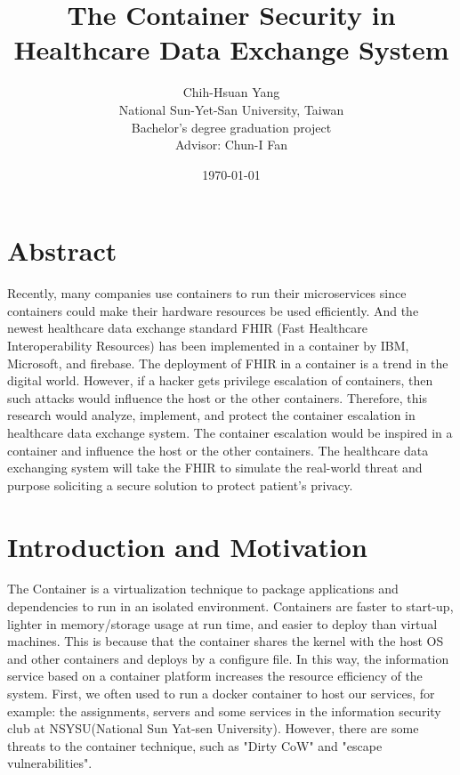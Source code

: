 \documentclass[12pt,a4paper]{article}
\title{{The Container Security in Healthcare Data Exchange System}}
\author{Chih-Hsuan Yang\\
National Sun-Yet-San University, Taiwan \\
Bachelor's degree graduation project \\
Advisor: Chun-I Fan
}
\date{\today}
\begin{document}
\section{Abstract}
Recently, many companies use containers to run their microservices since containers could
make their hardware resources be used efficiently. And the newest healthcare data exchange
standard FHIR (Fast Healthcare Interoperability Resources) \cite{FHIR_home} has been implemented
in a container by IBM, Microsoft, and firebase. The deployment of FHIR in a container is a
trend in the digital world.\cite{Infrastructures} However, if a hacker gets privilege
escalation of containers, then such attacks would influence the host or the other containers.
Therefore, this research would analyze, implement, and protect the container escalation
in healthcare data exchange system. The container escalation would be inspired in a container
and influence the host or the other containers. The healthcare data exchanging system will
take the FHIR to simulate the real-world threat and purpose soliciting a secure solution to
protect patient's privacy.


\section{Introduction and Motivation}
The Container is a virtualization technique to package applications and dependencies to run in
an isolated environment. Containers are faster to start-up, lighter in memory/storage usage
at run time, and easier to deploy than virtual machines. This is because that the container
shares the kernel with the host OS and other containers and deploys by a configure file.
\cite{Offloading} In this way, the information service based on a container platform increases
the resource efficiency of the system. \cite{Comparison}
First, we often used to run a docker container to host our services, for example: the assignments,
servers and some services in the information security club at NSYSU(National Sun Yat-sen University).
However, there are some threats to the container technique, such as "Dirty CoW" \cite{Dirty_CoW}
and "escape vulnerabilities".\\
\end{document}

